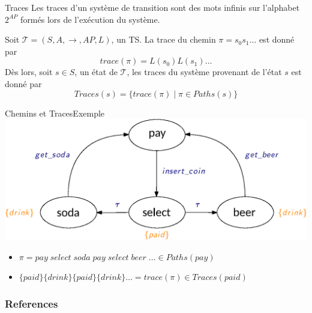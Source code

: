 \documentclass[compress]{beamer}
\begin{document}
\begin{frame}{Traces}
    Les traces d'un système de transition sont des mots infinis sur l'alphabet $2^{AP}$ formés lors de l'exécution du système. \\
\begin{definition}[Traces]
  Soit $\mathcal{T} = (S, A, \rightarrow, AP, L)$, un TS. La trace du chemin $\pi = s_0s_1 \dots$ est donné par \[trace(\pi) = L(s_0)L(s_1)\dots\]
  Dès lors, soit $s \in S$, un état de $\mathcal{T}$, les traces du système
  provenant de l'état $s$ est donné par \[Traces(s) = \{ trace(\pi) \; | \; \pi \in
  Paths(s) \}\]
\end{definition}
\end{frame}

\begin{frame}{Chemins et Traces}{Exemple}
    \includegraphics[width=\linewidth]{resources/TS.eps}
    \scriptsize
    \begin{itemize}
      \item $\pi = pay\; select \; soda \; pay \; select \; beer \; \dots \in Paths(pay)$
      \item $\{paid\}\{drink\}\{paid\}\{drink\} \dots = trace(\pi) \in Traces(paid)$
    \end{itemize}
\end{frame}

\begin{frame}[allowframebreaks]
        \frametitle{References}
      \printbibliography
\end{frame}
\end{document}
